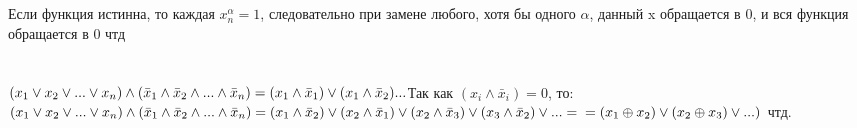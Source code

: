 \documentclass{article}
\begin{document}
\section{}
Если функция истинна, то каждая $x_n^\alpha=1$, следовательно при замене любого, хотя бы одного $\alpha$, данный x обращается в 0, и вся функция обращается в 0 чтд\\
\section{}
$(x_1 \vee x_2 \vee ... \vee x_n) \wedge (\bar x_1 \wedge \bar x_2 \wedge ... \wedge \bar x_n) = (x_1 \wedge \bar x_1) \vee (x_1 \wedge \bar x_2) ...\\ $Так как $(x_i \wedge \bar x_i) = 0$, то:\\
$(x_1 \vee x_2 \vee ... \vee x_n) \wedge (\bar x_1 \wedge \bar x_2 \wedge ... \wedge \bar x_n) = (x_1 \wedge \bar x_2) \vee (x_2 \wedge \bar x_1) \vee (x_2 \wedge \bar x_3) \vee (x_3 \wedge \bar x_2) \vee ... =\\= (x_1 \oplus x_2) \vee (x_2 \oplus x_3) \vee...)$ чтд.
\end{document}
